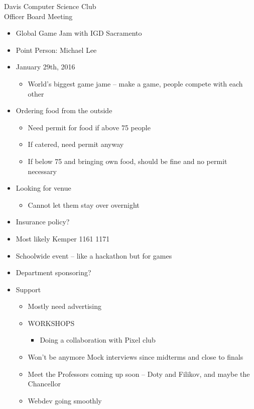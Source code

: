 \documentclass{article}
\begin{document}
\begin{Minutes}{Davis Computer Science Club\\Officer Board Meeting}
\begin {itemize}
\item Global Game Jam with IGD Sacramento
\item Point Person: Michael Lee
\item January 29th, 2016
    \begin{itemize}
    \item World's biggest game jame -- make a game, people compete with each other
    \end{itemize}
\item Ordering food from the outside
\begin{itemize}
    \item Need permit for food if above 75 people
    \item If catered, need permit anyway
    \item If below 75 and bringing own food, should be fine and no permit necessary
\end{itemize}
\item Looking for venue
\begin{itemize}
    \item Cannot let them stay over overnight
\end {itemize}
\item Insurance policy?
\item Most likely Kemper 1161 1171
\item Schoolwide event -- like a hackathon but for games
\item Department sponsoring?
\item Support
    \begin {itemize}
    \item Mostly need advertising
\item WORKSHOPS
    \begin {itemize}
    \item Doing a collaboration with Pixel club
    \end {itemize}
\end {itemize}

\begin {itemize}
\item Won't be anymore Mock interviews since midterms and close to finals
\item Meet the Professors coming up soon -- Doty and Filikov, and maybe the Chancellor
\end {itemize}

\begin {itemize}
\item Webdev going smoothly
\end {itemize}


\end{itemize}
\end{Minutes}
\end{document}
